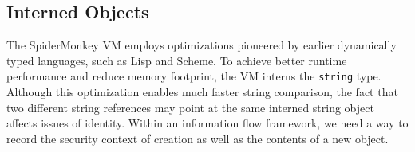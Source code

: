 \documentclass[11pt,onecolumn]{article}
\newcommand{\code}[1]{\texttt{#1}}
\begin{document}


\subsection{Interned Objects}\label{sec:interned-objects}

The SpiderMonkey VM employs optimizations pioneered by earlier dynamically typed languages, such as Lisp and Scheme.
To achieve better runtime performance and reduce memory footprint, the VM interns the \code{string} type.
Although this optimization enables much faster string comparison, the fact that two different string references may point at the same interned string object affects issues of identity.
Within an information flow framework, we need a way to record the security context of creation as well as the contents of a new object.
\end{document}
